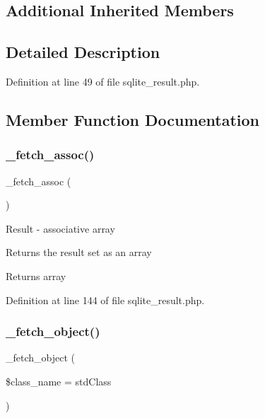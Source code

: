 \subsection*{Additional Inherited Members}


\subsection{Detailed Description}


Definition at line 49 of file sqlite\+\_\+result.\+php.



\subsection{Member Function Documentation}
\mbox{\label{class_c_i___d_b__sqlite__result_a43a9a92817f1334a1c10752ec44275a0}} 
\subsubsection{\texorpdfstring{\_fetch\_assoc()}{\_fetch\_assoc()}}
{\footnotesize\ttfamily \+\_\+fetch\+\_\+assoc (\begin{DoxyParamCaption}{ }\end{DoxyParamCaption})\hspace{0.3cm}{\ttfamily [protected]}}

Result -\/ associative array

Returns the result set as an array

\begin{DoxyReturn}{Returns}
array 
\end{DoxyReturn}


Definition at line 144 of file sqlite\+\_\+result.\+php.

\mbox{\label{class_c_i___d_b__sqlite__result_a60806be6a9c2488820813c2a7f4fef71}} 
\subsubsection{\texorpdfstring{\_fetch\_object()}{\_fetch\_object()}}
{\footnotesize\ttfamily \+\_\+fetch\+\_\+object (\begin{DoxyParamCaption}\item[{}]{\$class\+\_\+name = {\ttfamily \textquotesingle{}stdClass\textquotesingle{}} }\end{DoxyParamCaption})\hspace{0.3cm}{\ttfamily [protected]}}

